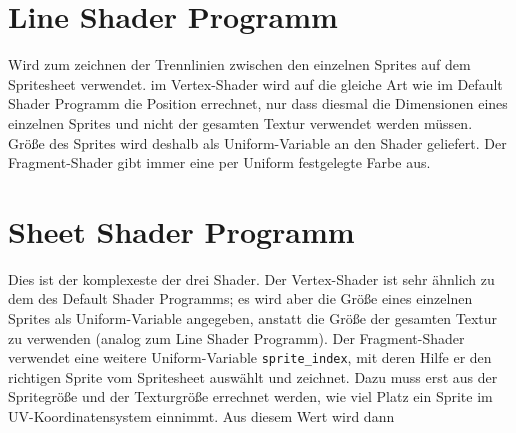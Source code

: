\section{Line Shader Programm}
Wird zum zeichnen der Trennlinien zwischen den einzelnen Sprites auf dem Spritesheet verwendet. im Vertex-Shader wird auf die gleiche Art wie im Default Shader Programm die Position errechnet, nur dass diesmal die Dimensionen eines einzelnen Sprites und nicht der gesamten Textur verwendet werden müssen. Größe des Sprites wird deshalb als Uniform-Variable an den Shader geliefert. Der Fragment-Shader gibt immer eine per Uniform festgelegte Farbe aus.

\section{Sheet Shader Programm}
Dies ist der komplexeste der drei Shader. Der Vertex-Shader ist sehr ähnlich zu dem des Default Shader Programms; es wird aber die Größe eines einzelnen Sprites als Uniform-Variable angegeben, anstatt die Größe der gesamten Textur zu verwenden (analog zum Line Shader Programm). Der Fragment-Shader verwendet eine weitere Uniform-Variable \lstinline{sprite_index}, mit deren Hilfe er den richtigen Sprite vom Spritesheet auswählt und zeichnet. Dazu muss erst aus der Spritegröße und der Texturgröße errechnet werden, wie viel Platz ein Sprite im UV-Koordinatensystem einnimmt. Aus diesem Wert wird dann 
